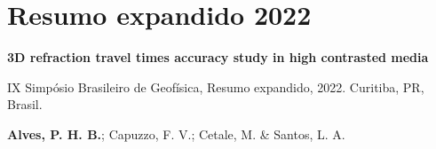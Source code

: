 \chapter{Resumo expandido 2022}

\begin{center}
	\textbf{3D refraction travel times accuracy study in high contrasted media}
\end{center}

\begin{center}
	 IX Simpósio Brasileiro de Geofísica, Resumo expandido, 2022. Curitiba, PR, Brasil.
\end{center}

\begin{center}
	\textbf{Alves, P. H. B.}; Capuzzo, F. V.; Cetale, M. \& Santos, L. A.    
\end{center}


